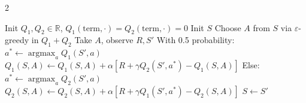 \documentclass[10pt]{article}
\DeclareMathOperator*{\argmax}{argmax}
\begin{document}
\begin{multicols*}{2}
	\begin{algorithm}[H]
		\caption{Double Q-learning ($Q_1 \approx Q_2 \approx q_*$)}
		\begin{algorithmic}[1]
			\State Init $Q_1, Q_2 \in \mathbb{R}$, $Q_1(\text{term}, \cdot)=Q_2(\text{term}, \cdot)=0$
			\State Init $S$
			\Repeat
			\State Choose $A$ from $S$ via $\varepsilon$-greedy in $Q_1 + Q_2$
			\State Take $A$, observe $R, S'$
			\State With 0.5 probability:
			\State \quad $a^* \gets \argmax_a Q_1(S', a)$
			\State \quad $Q_1(S,A) \gets Q_1(S,A) + \alpha [R + \gamma Q_2(S', a^*) - Q_1(S,A)]$
			\State Else:
			\State \quad $a^* \gets \argmax_a Q_2(S', a)$
			\State \quad $Q_2(S,A) \gets Q_2(S,A) + \alpha [R + \gamma Q_1(S', a^*) - Q_2(S,A)]$
			\State $S \gets S'$
			\EndFor
		\end{algorithmic}
	\end{algorithm}

\end{multicols*}
\end{document}
